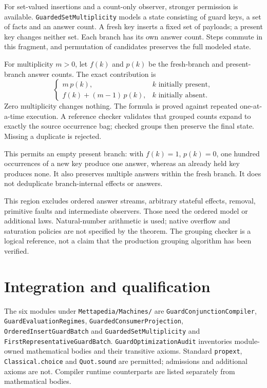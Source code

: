 \documentclass[11pt,a4paper]{article}
\newcommand{\code}[1]{\nolinkurl{#1}}
\begin{document}
For set-valued insertions and a count-only observer, stronger permission is
available. \code{GuardedSetMultiplicity} models a state consisting of guard
keys, a set of facts and an answer count. A fresh key inserts a fixed set of
payloads; a present key changes neither set. Each branch has its own answer
count. Steps commute in this fragment, and permutation of candidates
preserves the full modeled state.

For multiplicity $m>0$, let $f(k)$ and $p(k)$ be the fresh-branch and
present-branch answer counts. The exact contribution is
\[
 \begin{cases}
    m\,p(k), & k\text{ initially present},\\
    f(k)+(m-1)\,p(k), & k\text{ initially absent}.
 \end{cases}
\]
Zero multiplicity changes nothing. The formula is proved against repeated
one-at-a-time execution. A reference checker validates that grouped counts
expand to exactly the source occurrence bag; checked groups then preserve
the final state. Missing a duplicate is rejected.

This permits an empty present branch: with $f(k)=1$, $p(k)=0$, one hundred
occurrences of a new key produce one answer, whereas an already held key
produces none. It also preserves multiple answers within the fresh branch.
It does not deduplicate branch-internal effects or answers.

This region excludes ordered answer streams, arbitrary stateful effects,
removal, primitive faults and intermediate observers. Those need the ordered
model or additional laws. Natural-number arithmetic is used; native overflow
and saturation policies are not specified by the theorem. The grouping checker
is a logical reference, not a claim that the production grouping algorithm has
been verified.

\section{Integration and qualification}

The six modules under \code{Mettapedia/Machines/} are
\code{GuardConjunctionCompiler}, \code{GuardEvaluationRegimes},
\code{GuardedConsumerProjection}, \code{OrderedInsertGuardBatch} and
\code{GuardedSetMultiplicity} and \code{FirstRepresentativeGuardBatch}.
\code{GuardOptimizationAudit} inventories
module-owned mathematical bodies and their transitive axioms. Standard
\code{propext}, \code{Classical.choice} and \code{Quot.sound} are permitted;
admissions and additional axioms are not. Compiler runtime counterparts are
listed separately from mathematical bodies.
\end{document}
